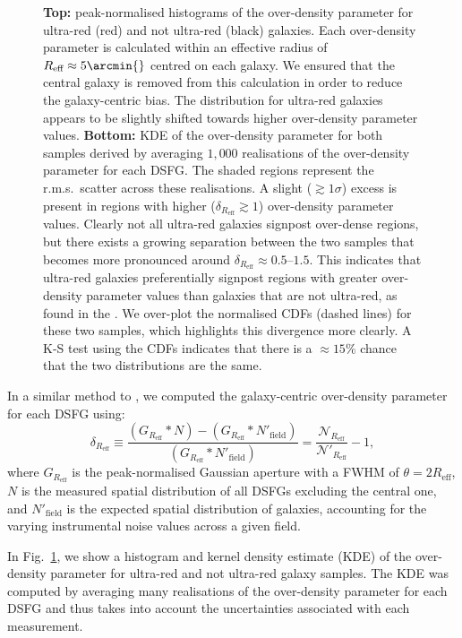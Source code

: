 \documentclass[a4paper, fleqn, usenatbib]{mnras}
\newcommand{\reff}{R_{\text{eff}}}
\newcommand{\urgs}{ultra-red galaxies}
\begin{document}
\begin{figure}
    \caption{\textbf{Top:} peak-normalised histograms of the over-density parameter for ultra-red (red) and not ultra-red (black) galaxies.
    Each over-density parameter is calculated within an effective radius of $\reff{}\approx5\arcmin{}$ centred on each galaxy.
    We ensured that the central galaxy is removed from this calculation in order to reduce the galaxy-centric bias.
    The distribution for ultra-red galaxies appears to be slightly shifted towards higher over-density parameter values.
    \textbf{Bottom:} KDE of the over-density parameter for both samples derived by averaging $1{,}000$ realisations of the over-density parameter for each DSFG.
    The shaded regions represent the r.m.s.\ scatter across these realisations.
    A slight ($\gtrsim1\sigma$) excess is present in regions with higher ($\delta_{\reff{}}\gtrsim1$) over-density parameter values.
    Clearly not all ultra-red galaxies signpost over-dense regions, but there exists a growing separation between the two samples that becomes more pronounced around $\delta_{\reff{}}\approx0.5\text{--}1.5$.
    This indicates that \urgs{} preferentially signpost regions with greater over-density parameter values than galaxies that are not ultra-red, as found in the .
    We over-plot the normalised CDFs (dashed lines) for these two samples, which highlights this divergence more clearly.
    A K-S test using the CDFs indicates that there is a $\approx15\%$ chance that the two distributions are the same.}
    \label{fig:over_density_parameter}
\end{figure}

In a similar method to , we computed the galaxy-centric over-density parameter for each DSFG using:
\begin{equation}
    \label{eq:over_density_s2cls}
    \delta_{\reff{}}\equiv
    \frac{ (G_{\reff{}}*N) - (G_{\reff{}}*N'_{\text{field}})}
    {(G_{\reff{}}*N'_{\text{field}})}=\frac{\mathcal{N}_{\reff{}}}{\mathcal{N}'_{\reff{}}} - 1,
\end{equation}
where $G_{\reff{}}$ is the peak-normalised Gaussian aperture with a FWHM of $\theta=2\reff{}$, $N$ is the measured spatial distribution of all DSFGs excluding the central one, and $N'_{\text{field}}$ is the expected spatial distribution of galaxies, accounting for the varying instrumental noise values across a given field.

In Fig.~\ref{fig:over_density_parameter}, we show a histogram and kernel density estimate (KDE) of the over-density parameter for ultra-red and not ultra-red galaxy samples.
The KDE was computed by averaging many realisations of the over-density parameter for each DSFG and thus takes into account the uncertainties associated with each measurement.
\end{document}

